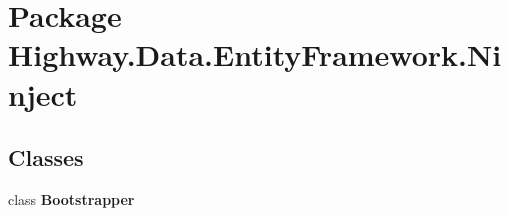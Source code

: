 \hypertarget{namespace_highway_1_1_data_1_1_entity_framework_1_1_ninject}{\section{Package Highway.\-Data.\-Entity\-Framework.\-Ninject}
\label{namespace_highway_1_1_data_1_1_entity_framework_1_1_ninject}
}
\subsection*{Classes}
\begin{DoxyCompactItemize}
\item 
class {\bfseries Bootstrapper}
\end{DoxyCompactItemize}

